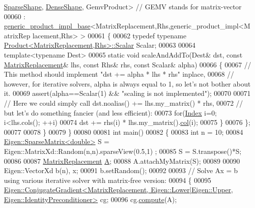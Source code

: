 \begin{DoxyCode}
      \hyperlink{struct_eigen_1_1_sparse_shape}{SparseShape}, \hyperlink{struct_eigen_1_1_dense_shape}{DenseShape}, GemvProduct> \textcolor{comment}{// GEMV stands for matrix-vector}
00060   : \hyperlink{struct_eigen_1_1internal_1_1generic__product__impl__base}{generic\_product\_impl\_base}<MatrixReplacement,Rhs,generic\_product\_impl<MatrixRep
      lacement,Rhs> >
00061   \{
00062     \textcolor{keyword}{typedef} \textcolor{keyword}{typename} \hyperlink{group___core___module_class_eigen_1_1_product}{Product<MatrixReplacement,Rhs>::Scalar} Scalar;
00063 
00064     \textcolor{keyword}{template}<\textcolor{keyword}{typename} Dest>
00065     \textcolor{keyword}{static} \textcolor{keywordtype}{void} scaleAndAddTo(Dest& dst, \textcolor{keyword}{const} \hyperlink{class_matrix_replacement}{MatrixReplacement}& lhs, \textcolor{keyword}{const} Rhs& rhs, \textcolor{keyword}{
      const} Scalar& alpha)
00066     \{
00067       \textcolor{comment}{// This method should implement "dst += alpha * lhs * rhs" inplace,}
00068       \textcolor{comment}{// however, for iterative solvers, alpha is always equal to 1, so let's not bother about it.}
00069       assert(alpha==Scalar(1) && \textcolor{stringliteral}{"scaling is not implemented"});
00070 
00071       \textcolor{comment}{// Here we could simply call dst.noalias() += lhs.my\_matrix() * rhs,}
00072       \textcolor{comment}{// but let's do something fancier (and less efficient):}
00073       \textcolor{keywordflow}{for}(\hyperlink{namespace_eigen_a62e77e0933482dafde8fe197d9a2cfde}{Index} i=0; i<lhs.cols(); ++i)
00074         dst += rhs(i) * lhs.my\_matrix().\hyperlink{group___sparse_core___module_a8f4eaa3c3921ef3823ffc69ebcc356af}{col}(i);
00075     \}
00076   \};
00077 
00078 \}
00079 \}
00080 
00081 \textcolor{keywordtype}{int} main()
00082 \{
00083   \textcolor{keywordtype}{int} n = 10;
00084   \hyperlink{group___sparse_core___module}{Eigen::SparseMatrix<double>} S = Eigen::MatrixXd::Random(n,n).sparseView(0.5,1)
      ;
00085   S = S.transpose()*S;
00086 
00087   \hyperlink{class_matrix_replacement}{MatrixReplacement} \hyperlink{group___core___module_class_eigen_1_1_matrix}{A};
00088   A.attachMyMatrix(S);
00089 
00090   Eigen::VectorXd b(n), x;
00091   b.setRandom();
00092 
00093   \textcolor{comment}{// Solve Ax = b using various iterative solver with matrix-free version:}
00094   \{
00095     
      \hyperlink{group___iterative_linear_solvers___module_class_eigen_1_1_conjugate_gradient}{Eigen::ConjugateGradient<MatrixReplacement, Eigen::Lower|Eigen::Upper, Eigen::IdentityPreconditioner>}
       cg;
00096     cg.\hyperlink{group___iterative_linear_solvers___module_a7dfa55c55e82d697bde227696a630914}{compute}(A);

\end{DoxyCode}
